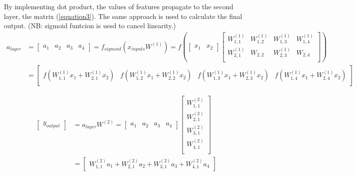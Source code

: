 \documentclass{article}
\begin{document}
\begin{spacing}{2}
    \noindent By implementing dot product, the values of features propagate to the second layer, the matrix (\ref{equation3}). The same approach is used to calculate the final output. (NB: sigmoid funtcion is uesd to cancel linearity.)
        \begin{align}\label{equation3}
        a_{layer}&=
        {\left[ \begin{array}{cccc}
       a_1&a_2&a_3&a_4
        \end{array}\right]}
        =f_{sigmoid}(x_{inputs}W^{(1)})
        =f(
        {\left[ \begin{array}{cc}
            x_1 & x_2
        \end{array}\right]}
        {\left[ \begin{array}{cccc}
            W^{(1)}_{1,1} & W^{(1)}_{1,2} & W^{(1)}_{1,3} & W^{(1)}_{1,4}\\
            W^{(1)}_{2,1} & W_{2,2} & W^{(1)}_{2,3} & W_{2,4}\\
        \end{array}\right]})\nonumber\\
        &=
        {\left[ \begin{array}{ccccc}
            f(W^{(1)}_{1,1}x_1+W^{(1)}_{2,1}x_2) & f(W^{(1)}_{1,2}x_1+W^{(1)}_{2,2}x_2) &f(W^{(1)}_{1,3}x_1+W^{(1)}_{2,3}x_2) &f(W^{(1)}_{1,4}x_1+W^{(1)}_{2,4}x_2)
        \end{array}\right]}
    \end{align}  

    \begin{align*} 
        {\left[ \begin{array}{c}
        y_{output}
        \end{array}\right]}&=
        a_{layer}W^{(2)}
        ={\left[ \begin{array}{cccc}
            a_1&a_2&a_3&a_4
             \end{array}\right]}
        {\left[ \begin{array}{c}
            W^{(2)}_{1,1}\\
            W^{(2)}_{2,1}\\
            W^{(2)}_{3,1}\\
            W^{(2)}_{4,1}\\
        \end{array}\right]}\\
        &={\left[ \begin{array}{c}
            W^{(2)}_{1,1}a_1+W^{(2)}_{2,1}a_2+W^{(2)}_{3,1}a_3+W^{(2)}_{4,1}a_4
        \end{array}\right]}
    \end{align*}


\end{spacing}
\end{document}
